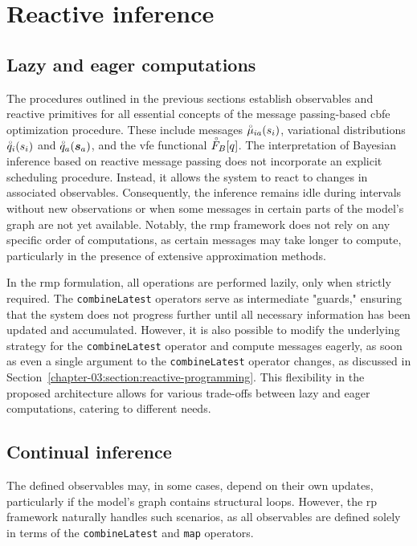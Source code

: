 \section{Reactive inference}\label{chapter-03:section:reactive-continual-inference}

\subsection{Lazy and eager computations}

The procedures outlined in the previous sections establish observables and reactive primitives
for all essential concepts of the message passing-based \ac{cbfe} optimization procedure.
These include messages $\accentset{\circ}{\mu}_{ia}(s_i)$, variational distributions $\accentset{\circ}{q}_i(s_i)$ and
$\accentset{\circ}{q}_a(\bm{s}_a)$, and the \ac{vfe} functional $\accentset{\circ}{F}_B[q]$.
The interpretation of Bayesian inference based on reactive message passing does not
incorporate an explicit scheduling procedure.
Instead, it allows the system to react to changes in associated observables.
Consequently, the inference remains idle during intervals without new observations or when
some messages in certain parts of the model's graph are not yet available.
Notably, the \ac{rmp} framework does not rely on any specific order of computations, as certain
messages may take longer to compute, particularly in the presence of extensive approximation
methods.

In the \ac{rmp} formulation, all operations are performed lazily, only when strictly required.
The \texttt{combineLatest} operators serve as intermediate "guards," ensuring that the system
does not progress further until all necessary information has been updated and accumulated.
However, it is also possible to modify the underlying strategy for the \texttt{combineLatest}
operator and compute messages eagerly, as soon as even a single argument to the
\texttt{combineLatest} operator changes, as discussed in
Section~\ref{chapter-03:section:reactive-programming}.
This flexibility in the proposed architecture allows for various trade-offs between lazy and
eager computations, catering to different needs.

\subsection{Continual inference}

The defined observables may, in some cases, depend on their own updates, particularly if the
model's graph contains structural loops.
However, the \ac{rp} framework naturally handles such scenarios, as all
observables are defined solely in terms of the \texttt{combineLatest} and \texttt{map}
operators.

